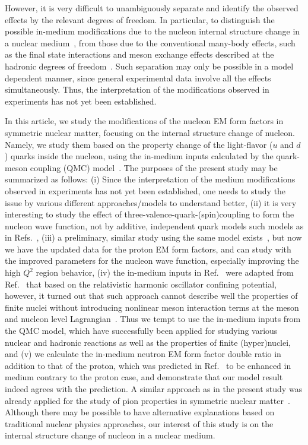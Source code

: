 \documentclass[preprint,aps,showpacs,floatfix]{revtex4}
\begin{document}
However, it is very difficult to unambiguously separate and identify
the observed effects by the relevant degrees of freedom. 
In particular, to distinguish the possible in-medium modifications     
due to the nucleon internal structure change 
in a nuclear medium~\cite{Hatsuda,Guichon,QMCreview,Hayano,Brooks,Krein:2017usp,NEMC,Hen,Lu1,Lu2,
Frederico,Batista2002,Wilson1},  
from those due to the conventional many-body effects, such as the final state interactions 
and meson exchange effects described at the hadronic degrees of freedom~\cite{Schiavilla}.  
Such separation may only  be possible in a model dependent manner, 
since general experimental data involve all the effects simultaneously.
Thus, the interpretation of the modifications observed in experiments 
has not yet been established. 

In this article, we study the modifications of the nucleon EM form factors 
in symmetric nuclear matter, focusing on the internal structure change of nucleon.
Namely, we study them based on the property change of the light-flavor 
($u$ and $d$) quarks inside the nucleon, using the in-medium inputs 
calculated by the quark-meson coupling (QMC) model~\cite{Guichon,QMCreview}.
The purposes of the present study may be summarized as follows:  
(i) Since the interpretation of the medium modifications observed in 
experiments has not yet been established, one needs to study the issue by various 
different approaches/models to understand better, 
(ii) it is very interesting to study the effect of three-valence-quark-(spin)coupling  
to form the nucleon wave function, not by additive, independent quark models 
such models as in Refs.~\cite{Guichon,QMCreview,Lu1,Lu2,Batista2002}, 
(iii) a preliminary, similar study using the same model 
exists~\cite{Wilson1}, but now we have the updated data for the proton 
EM form factors, and can study with the improved parameters for the nucleon 
wave function, especially improving the high $Q^2$ region behavior, 
(iv) the in-medium inputs in Ref.~\cite{Wilson1} were adapted from 
Ref.~\cite{Frederico,Batista2002} that based on the relativistic harmonic oscillator confining potential, 
however, it turned out that such approach cannot describe well the properties of 
finite nuclei without introducing nonlinear meson interaction terms 
at the meson and nucleon level Lagrangian~\cite{Xing}. Thus we tempt to use 
the in-medium inputs from the QMC model, which have successfully been applied 
for studying various nuclear and hadronic reactions as well as the properties 
of finite (hyper)nuclei, and (v) we calculate the in-medium neutron 
EM form factor double ratio in addition to that of the proton, which 
was predicted in Ref.~\cite{Cloet} to be enhanced in medium contrary 
to the proton case, and demonstrate that our model result indeed agrees with the prediction.
A similar approach as in the present study was already applied for 
the study of pion properties in symmetric nuclear 
matter~\cite{pimedium1,pimedium2,pimedium3,pimedium4}.  
Although there may be possible to have alternative explanations based on traditional 
nuclear physics approaches, our interest of this study is on the 
internal structure change of nucleon in a nuclear medium. 
\end{document}
